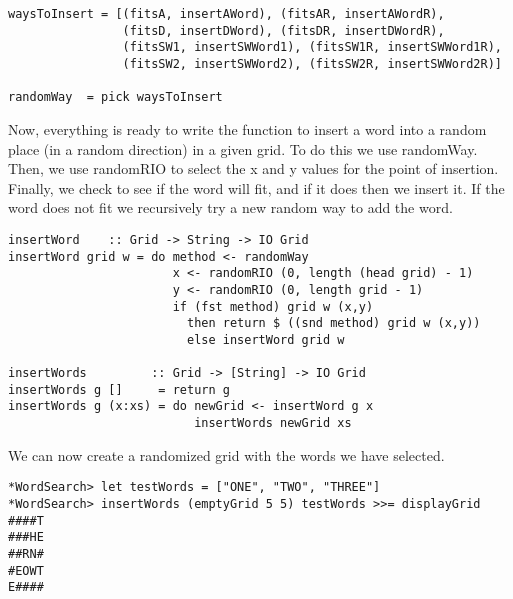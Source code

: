 \documentclass[12pt]{report}   %
\begin{document}
    \begin{lstlisting}
waysToInsert = [(fitsA, insertAWord), (fitsAR, insertAWordR),
                (fitsD, insertDWord), (fitsDR, insertDWordR),
                (fitsSW1, insertSWWord1), (fitsSW1R, insertSWWord1R),
                (fitsSW2, insertSWWord2), (fitsSW2R, insertSWWord2R)]

randomWay  = pick waysToInsert
    \end{lstlisting}

    \vspace{12pt}

    Now, everything is ready to write the function to insert a word into a
    random place (in a random direction) in a given grid. To do this we use
    randomWay. Then, we use randomRIO to select the x and y values for the
    point of insertion. Finally, we check to see if the word will fit, and if
    it does then we insert it. If the word does not fit we recursively try a
    new random way to add the word.

    \vspace{12pt}

    \begin{lstlisting}
insertWord    :: Grid -> String -> IO Grid
insertWord grid w = do method <- randomWay
                       x <- randomRIO (0, length (head grid) - 1)
                       y <- randomRIO (0, length grid - 1)
                       if (fst method) grid w (x,y)
                         then return $ ((snd method) grid w (x,y))
                         else insertWord grid w

insertWords         :: Grid -> [String] -> IO Grid
insertWords g []     = return g
insertWords g (x:xs) = do newGrid <- insertWord g x
                          insertWords newGrid xs
    \end{lstlisting}

    \vspace{12pt}

    We can now create a randomized grid with the words we have selected.

    \vspace{12pt}

    \begin{lstlisting}
*WordSearch> let testWords = ["ONE", "TWO", "THREE"]
*WordSearch> insertWords (emptyGrid 5 5) testWords >>= displayGrid
####T
###HE
##RN#
#EOWT
E####
    \end{lstlisting}

    \vspace{12pt}
\end{document}
